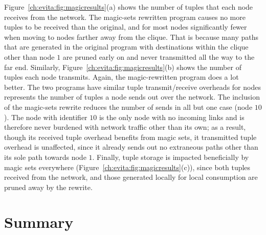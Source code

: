 Figure~\ref{ch:evita:fig:magicresults}(a) shows the number of tuples that each
node receives from the network.  The magic-sets rewritten program causes no
more tuples to be received than the original, and for most nodes significantly
fewer when moving to nodes farther away from the clique.  That is because many
paths that are generated in the original program with destinations within the
clique other than node $1$ are pruned early on and never transmitted all the
way to the far end.  Similarly, Figure~\ref{ch:evita:fig:magicresults}(b) shows
the number of tuples each node transmits.  Again, the magic-rewritten program
does a lot better.  The two programs have similar tuple transmit/receive
overheads for nodes represents the number of tuples a node sends out over the
network.  The inclusion of the magic-sets rewrite reduces the number of sends
in all but one case (node $10$).  The node with identifier $10$ is the only
node with no incoming links and is therefore never burdened with network
traffic other than its own; as a result, though its received tuple overhead
benefits from magic sets, it transmitted tuple overhead is unaffected, since it
already sends out no extraneous paths other than its sole path towards node
$1$.  Finally, tuple storage is impacted beneficially by magic sets everywhere
(Figure~\ref{ch:evita:fig:magicresults}(c)), since both  tuples
received from the network, and those generated locally for local consumption
are pruned away by the rewrite.


\section{Summary}
\label{ch:magic:sec:summary}


